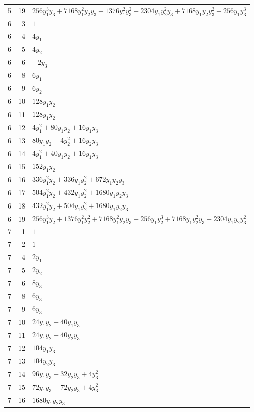 \documentclass[10pt,a4paper]{article}
\begin{document}
{\begin{longtable}{rrp{125mm}}
5 & 19 & $256 y_{1}^{3} y_{3} + 7168 y_{1}^{2} y_{2} y_{3} + 1376 y_{1}^{2} y_{3}^{2} + 2304 y_{1} y_{2}^{2} y_{3} + 7168 y_{1} y_{2} y_{3}^{2} + 256 y_{1} y_{3}^{3}$\\
6 & 3 & $1$\\
6 & 4 & $4 y_{1}$\\
6 & 5 & $4 y_{2}$\\
6 & 6 & $- 2 y_{3}$\\
6 & 8 & $6 y_{1}$\\
6 & 9 & $6 y_{2}$\\
6 & 10 & $128 y_{1} y_{2}$\\
6 & 11 & $128 y_{1} y_{2}$\\
6 & 12 & $4 y_{1}^{2} + 80 y_{1} y_{2} + 16 y_{1} y_{3}$\\
6 & 13 & $80 y_{1} y_{2} + 4 y_{2}^{2} + 16 y_{2} y_{3}$\\
6 & 14 & $4 y_{1}^{2} + 40 y_{1} y_{2} + 16 y_{1} y_{3}$\\
6 & 15 & $152 y_{1} y_{2}$\\
6 & 16 & $336 y_{1}^{2} y_{2} + 336 y_{1} y_{2}^{2} + 672 y_{1} y_{2} y_{3}$\\
6 & 17 & $504 y_{1}^{2} y_{2} + 432 y_{1} y_{2}^{2} + 1680 y_{1} y_{2} y_{3}$\\
6 & 18 & $432 y_{1}^{2} y_{2} + 504 y_{1} y_{2}^{2} + 1680 y_{1} y_{2} y_{3}$\\
6 & 19 & $256 y_{1}^{3} y_{2} + 1376 y_{1}^{2} y_{2}^{2} + 7168 y_{1}^{2} y_{2} y_{3} + 256 y_{1} y_{2}^{3} + 7168 y_{1} y_{2}^{2} y_{3} + 2304 y_{1} y_{2} y_{3}^{2}$\\
7 & 1 & $1$\\
7 & 2 & $1$\\
7 & 4 & $2 y_{1}$\\
7 & 5 & $2 y_{2}$\\
7 & 6 & $8 y_{3}$\\
7 & 8 & $6 y_{3}$\\
7 & 9 & $6 y_{3}$\\
7 & 10 & $24 y_{1} y_{2} + 40 y_{1} y_{3}$\\
7 & 11 & $24 y_{1} y_{2} + 40 y_{2} y_{3}$\\
7 & 12 & $104 y_{1} y_{3}$\\
7 & 13 & $104 y_{2} y_{3}$\\
7 & 14 & $96 y_{1} y_{3} + 32 y_{2} y_{3} + 4 y_{3}^{2}$\\
7 & 15 & $72 y_{1} y_{3} + 72 y_{2} y_{3} + 4 y_{3}^{2}$\\
7 & 16 & $1680 y_{1} y_{2} y_{3}$\\

\end{longtable}}
\end{document}
